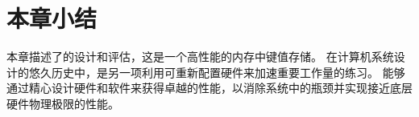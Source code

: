 \section{本章小结}
\label{kvdirect:sec:conclusion}


本章描述了\oursys {}的设计和评估，这是一个高性能的内存中键值存储。 在计算机系统设计的悠久历史中，\oursys {}是另一项利用可重新配置硬件来加速重要工作量的练习。 \oursys {}能够通过精心设计硬件和软件来获得卓越的性能，以消除系统中的瓶颈并实现接近底层硬件物理极限的性能。

